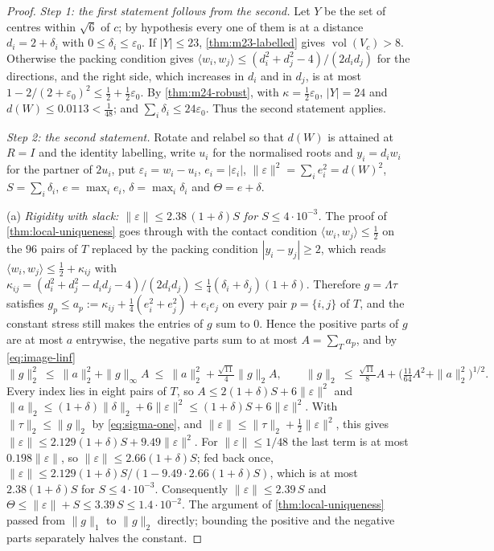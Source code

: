 \documentclass[11pt,reqno]{amsart}
\renewcommand{\_}{\origunderscore\allowbreak}
\numberwithin{equation}{section}
\theoremstyle{plain}
\theoremstyle{definition}
\theoremstyle{remark}
\DeclareMathOperator{\vol}{vol}
\begin{document}
\begin{proof}
\emph{Step 1: the first statement follows from the second.} Let $Y$ be the
set of centres within $\sqrt6$ of $c$; by hypothesis every one of them is
at a distance $d_i=2+\delta_i$ with $0\le\delta_i\le\varepsilon_0$. If
$|Y|\le23$, \cref{thm:m23-labelled} gives $\vol(V_c)>8$. Otherwise the
packing condition gives
$\langle w_i,w_j\rangle\le(d_i^2+d_j^2-4)/(2d_id_j)$ for the directions,
and the right side, which increases in $d_i$ and in $d_j$, is at most
$1-2/(2+\varepsilon_0)^2\le\tfrac12+\tfrac12\varepsilon_0$. By
\cref{thm:m24-robust}, with $\kappa=\tfrac12\varepsilon_0$, $|Y|=24$ and
$d(W)\le0.0113<\frac1{48}$; and $\sum_i\delta_i\le24\varepsilon_0$. Thus the
second statement applies.

\emph{Step 2: the second statement.} Rotate and relabel so that $d(W)$
is attained at $R=I$ and the identity labelling, write $u_i$ for the
normalised roots and $y_i=d_iw_i$ for the partner of $2u_i$, put
$\varepsilon_i=w_i-u_i$, $e_i=|\varepsilon_i|$,
$\|\varepsilon\|^2=\sum_ie_i^2=d(W)^2$, $S=\sum_i\delta_i$,
$e=\max_ie_i$, $\delta=\max_i\delta_i$ and $\Theta=e+\delta$.

(a) \emph{Rigidity with slack: $\|\varepsilon\|\le2.38\,(1+\delta)S$ for
$S\le4\cdot10^{-3}$.} The proof of \cref{thm:local-uniqueness} goes through
with the contact condition $\langle w_i,w_j\rangle\le\frac12$ on the $96$
pairs of $T$ replaced by the packing condition $|y_i-y_j|\ge2$, which reads
$\langle w_i,w_j\rangle\le\frac12+\kappa_{ij}$ with
$\kappa_{ij}=(d_i^2+d_j^2-d_id_j-4)/(2d_id_j)
\le\frac14(\delta_i+\delta_j)(1+\delta)$. Therefore $g=\Lambda\tau$ satisfies
$g_p\le a_p:=\kappa_{ij}+\frac14(e_i^2+e_j^2)+e_ie_j$ on every pair $p=\{i,j\}$ of
$T$, and the constant stress still makes the entries of $g$ sum to $0$.
Hence the positive parts of $g$ are at most $a$ entrywise, the negative
parts sum to at most $A=\sum_Ta_p$, and by \eqref{eq:image-linf}
\[
  \|g\|_2^2\ \le\ \|a\|_2^2+\|g\|_\infty A\ \le\ \|a\|_2^2+\tfrac{\sqrt{11}}4\|g\|_2A,
  \qquad
  \|g\|_2\ \le\ \tfrac{\sqrt{11}}8A+\bigl(\tfrac{11}{64}A^2+\|a\|_2^2\bigr)^{1/2}.
\]
Every index lies in eight pairs of $T$, so $A\le2(1+\delta)S+6\|\varepsilon\|^2$
and $\|a\|_2\le(1+\delta)\|\delta\|_2+6\|\varepsilon\|^2\le(1+\delta)S+6\|\varepsilon\|^2$.
With $\|\tau\|_2\le\|g\|_2$ by \eqref{eq:sigma-one}, and
$\|\varepsilon\|\le\|\tau\|_2+\frac12\|\varepsilon\|^2$, this gives
$\|\varepsilon\|\le2.129(1+\delta)S+9.49\|\varepsilon\|^2$. For $\|\varepsilon\|\le1/48$
the last term is at most $0.198\|\varepsilon\|$, so $\|\varepsilon\|\le2.66(1+\delta)S$;
fed back once, $\|\varepsilon\|\le2.129(1+\delta)S/(1-9.49\cdot2.66(1+\delta)S)$,
which is at most $2.38(1+\delta)S$ for $S\le4\cdot10^{-3}$. Consequently
$\|\varepsilon\|\le2.39\,S$ and $\Theta\le\|\varepsilon\|+S\le3.39\,S\le1.4\cdot10^{-2}$.
The argument of \cref{thm:local-uniqueness} passed from $\|g\|_1$ to $\|g\|_2$
directly; bounding the positive and the negative parts separately
halves the constant.


\end{proof}
\end{document}
